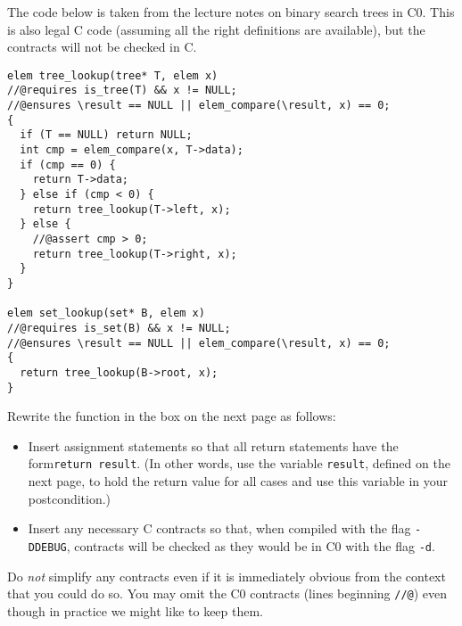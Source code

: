 \clearpage
{}

The code below is taken from the lecture notes on binary search trees in
C0. This is also legal C code (assuming all the right definitions are
available), but the contracts will not be checked in C.

\begin{lstlisting}
elem tree_lookup(tree* T, elem x)
//@requires is_tree(T) && x != NULL;
//@ensures \result == NULL || elem_compare(\result, x) == 0;
{
  if (T == NULL) return NULL;
  int cmp = elem_compare(x, T->data);
  if (cmp == 0) {
    return T->data;
  } else if (cmp < 0) {
    return tree_lookup(T->left, x);
  } else {
    //@assert cmp > 0;
    return tree_lookup(T->right, x);
  }
}

elem set_lookup(set* B, elem x)
//@requires is_set(B) && x != NULL;
//@ensures \result == NULL || elem_compare(\result, x) == 0;
{
  return tree_lookup(B->root, x);
}
\end{lstlisting}

Rewrite the function in the box on the next page as follows:
\begin{itemize}
\item%
  Insert assignment statements so that all return statements have the form\linebreak[4]
  \lstinline'return result'. (In other words, use the variable
  \lstinline'result', defined on the next page, to hold the return value for
  all cases and use this variable in your postcondition.)
\item%
  Insert any necessary C contracts so that, when compiled with the flag
  \lstinline'-DDEBUG', contracts will be checked as they would be in C0 with
  the flag \lstinline'-d'.
\end{itemize}
Do \emph{not} simplify any contracts even if it is immediately obvious from
the context that you could do so. You may omit the C0 contracts (lines
beginning \lstinline'//@') even though in practice we might like to keep them.

